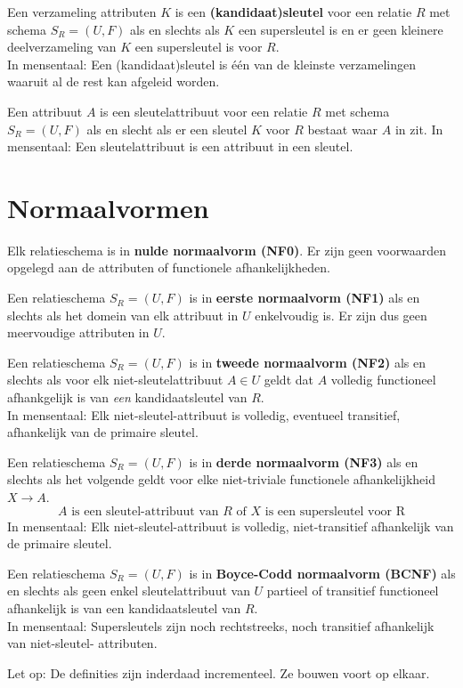 \documentclass[normaalvormen.tex]{subfiles}
\begin{document}
\begin{de}
Een verzameling attributen $K$ is een \textbf{(kandidaat)sleutel}  voor een relatie $R$ met schema $S_{R} = (U,F)$ als en slechts als $K$ een supersleutel is en er geen kleinere deelverzameling van $K$ een supersleutel is voor $R$.\\
In mensentaal: Een (kandidaat)sleutel is \'e\'en van de kleinste verzamelingen waaruit al de rest kan afgeleid worden.
\end{de}

\begin{de}
Een attribuut $A$ is een sleutelattribuut voor een relatie $R$ met schema $S_{R} = (U,F)$ als en slecht als er een sleutel $K$ voor $R$ bestaat waar $A$ in zit.
In mensentaal: Een sleutelattribuut is een attribuut in een sleutel.
\end{de}

\section{Normaalvormen}
\begin{de}
Elk relatieschema is in \textbf{nulde normaalvorm (NF0)}. Er zijn geen voorwaarden opgelegd aan de attributen of functionele afhankelijkheden.
\end{de}

\begin{de}
Een relatieschema $S_{R} = (U,F)$ is in \textbf{eerste normaalvorm (NF1)} als en slechts als het domein van elk attribuut in $U$ enkelvoudig is. Er zijn dus geen meervoudige attributen in $U$.
\end{de}

\begin{de}
Een relatieschema $S_{R} = (U,F)$ is in \textbf{tweede normaalvorm (NF2)} als en slechts als voor elk niet-sleutelattribuut $A \in U$ geldt dat $A$ volledig functioneel afhankgelijk is van \emph{een} kandidaatsleutel van $R$.\\
In mensentaal: Elk niet-sleutel-attribuut is volledig, eventueel transitief, afhankelijk van de primaire sleutel.
\end{de}

\begin{de}
Een relatieschema $S_{R} = (U,F)$ is in \textbf{derde normaalvorm (NF3)} als en slechts als het volgende geldt voor elke niet-triviale functionele afhankelijkheid $X\rightarrow A$.
\[
A \text{ is een sleutel-attribuut van } R \text{ of } X \text{ is een supersleutel voor R}
\]
In mensentaal: Elk niet-sleutel-attribuut is volledig, niet-transitief afhankelijk van de primaire sleutel.
\end{de}

\begin{de}
Een relatieschema $S_{R} = (U,F)$ is in \textbf{Boyce-Codd normaalvorm (BCNF)} als en slechts als geen enkel sleutelattribuut van $U$ partieel of transitief functioneel afhankelijk is van een kandidaatsleutel van $R$.\\
In mensentaal: Supersleutels zijn  noch rechtstreeks, noch transitief afhankelijk van niet-sleutel- attributen.
\end{de}

Let op: De definities zijn inderdaad incrementeel. Ze bouwen voort op elkaar.
\end{document}
